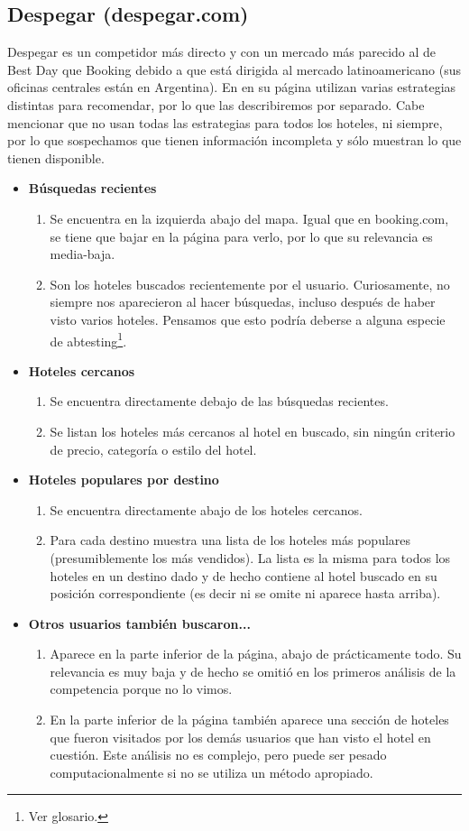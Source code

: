 \documentclass[12pt]{report}
\begin{document}
\subsection*{Despegar (despegar.com)}

Despegar es un competidor más directo y con un mercado más parecido al de Best Day que Booking debido a que está dirigida al mercado latinoamericano (sus oficinas centrales están en Argentina). En en su página utilizan varias estrategias distintas para recomendar, por lo que las describiremos por separado. Cabe mencionar que no usan todas las estrategias para todos los hoteles, ni siempre, por lo que sospechamos que tienen información incompleta y sólo muestran lo que tienen disponible.
\begin{itemize}
	\item \textbf{Búsquedas recientes}
	\begin{enumerate}
		\item Se encuentra en la izquierda abajo del mapa. Igual que en booking.com, se tiene que bajar en la página para verlo, por lo que su relevancia es media-baja.
		\item Son los hoteles buscados recientemente por el usuario. Curiosamente, no siempre nos aparecieron al hacer búsquedas, incluso después de haber visto varios hoteles. Pensamos que esto podría deberse a alguna especie de \gls{abtesting}\footnote{Ver glosario.}.
	\end{enumerate}
	\item \textbf{Hoteles cercanos}
	\begin{enumerate}
		\item Se encuentra directamente debajo de las búsquedas recientes.
		\item Se listan los hoteles más cercanos al hotel en buscado, sin ningún criterio de precio, categoría o estilo del hotel.
	\end{enumerate}
		\item \textbf{Hoteles populares por destino}
	\begin{enumerate}
		\item Se encuentra directamente abajo de los hoteles cercanos.
		\item Para cada destino muestra una lista de los hoteles más populares (presumiblemente los más vendidos). La lista es la misma para todos los hoteles en un destino dado y de hecho contiene al hotel buscado en su posición correspondiente (es decir ni se omite ni aparece hasta arriba).
	\end{enumerate}
	\item \textbf{Otros usuarios también buscaron...}
	\begin{enumerate}
		\item Aparece en la parte inferior de la página, abajo de prácticamente todo. Su relevancia es muy baja y de hecho se omitió en los primeros análisis de la competencia porque no lo vimos.
		\item En la parte inferior de la página también aparece una sección de hoteles que fueron visitados por los demás usuarios que han visto el hotel en cuestión. Este análisis no es complejo, pero puede ser pesado computacionalmente si no se utiliza un  método apropiado.
	\end{enumerate}
\end{itemize}
\end{document}
